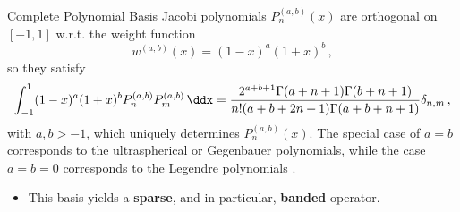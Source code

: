\documentclass[aspectratio=169, hyperref={colorlinks=true}]{beamer}
\begin{document}
  \begin{frame}{Complete Polynomial Basis}
    Jacobi polynomials $P_n^{(a,b)}(x)$ are orthogonal on $[-1,1]$ w.r.t. the weight function
    \begin{equation*}
      w^{(a,b)}(x)=(1-x)^a (1+x)^b\,,
    \end{equation*}
    so they satisfy
    \begin{align*}\label{eq:orthogonalityconditionJacobi}
      \int_{-1}^1(1-x)^a(1+x)^bP_n^{(a,b)}P_m^{(a,b)}\,\ddx = \frac{2^{a+b+1} \Gamma (a+n+1) \Gamma (b+n+1)}{n! (a+b+2 n+1) \Gamma (a+b+n+1)} \delta_{n,m}\,,
    \end{align*}
    with $a	,b>-1$, which uniquely determines $P_n^{(a,b)}(x)$. The special case of $a=b$ corresponds to the ultraspherical or Gegenbauer polynomials, while the case $a=b=0$ corresponds to the Legendre polynomials \cite{2018-nist}.

    \begin{itemize}
      \item This basis yields a \textbf{sparse}, and in particular, \textbf{banded} operator.
    \end{itemize}
  \end{frame}
\end{document}

